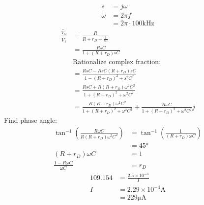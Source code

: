 \documentclass{article}
\begin{document}
\begin{multicols}{2}
    \begin{align*}
        s      & = j \omega                       \\
        \omega & = 2\pi f                         \\
               & = 2\pi \cdot 100\si{\kilo\hertz}
    \end{align*}
    \begin{align*}
        \frac{\tilde{V_O}}{\tilde{V_I}} & = \frac{R}{R + r_D + \frac{1}{sC}}                                                                             \\
                                        & = \frac{RsC}{1 + (R + r_D) sC}                                                                                 \\
                                        & \text{Rationalize complex fraction:}                                                                           \\
                                        & = \frac{RsC - RsC(R+r_D)sC}{1-{(R + r_D)}^2 +s^2 C^2}                                                          \\
                                        & = \frac{RsC + R(R+r_D)\omega^2C^2}{1+{(R + r_D)}^2 +\omega^2 C^2}                                              \\
                                        & = \frac{R(R+r_D)\omega^2C^2}{1+{(R + r_D)}^2 +\omega^2 C^2}+ \frac{R\omega C}{1+{(R + r_D)}^2 +\omega^2 C^2} j
    \end{align*}
    Find phase angle:
    \begin{align*}
        \tan^{-1} \left(\frac{R\omega C}{R(R+r_D)\omega^2C^2}\right) & = \tan^{-1} \left(\frac{1}{(R+r_D)\omega C}\right) \\
                                                                     & = \ang{45}                                         \\
        (R+r_D)\omega C                                              & =1                                                 \\
        \frac{1-R\omega C}{\omega C}                                 & = r_D
    \end{align*}
    \begin{align*}
        109.154 & = \frac{2.5\times 10^{-3}}{I}     \\
        I       & = 2.29\times 10^{-4} \si{\ampere} \\
                & = 229 \si{\micro\ampere}
    \end{align*}
\end{multicols}
\end{document}

